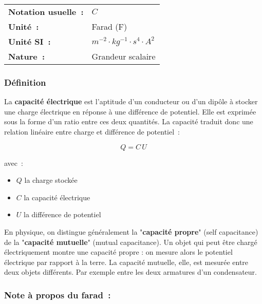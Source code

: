 \vspace{0.5cm}
\begin{tabular}{ll}
\textbf{Notation usuelle~:} & $C$ \\
\textbf{Unité~:} & Farad (F) \\
	\textbf{Unité SI~:} & $m^{-2} \cdot kg^{-1} \cdot {s}^{4} \cdot A^{2}$ \\
\textbf{Nature~:} & Grandeur scalaire \\
\end{tabular} 

\subsubsection*{Définition}

La \textbf{capacité électrique} est l'aptitude d'un conducteur ou d'un dipôle à stocker une charge électrique en réponse à une différence de potentiel. Elle est exprimée sous la forme d'un ratio entre ces deux quantités. La capacité traduit donc une relation linéaire entre charge et différence de potentiel~:

\begin{equation}
	Q = C\,U
\end{equation}

avec~:\\
\begin{itemize}
	\item $Q$ la charge stockée
	\item $C$ la capacité électrique
	\item $U$ la différence de potentiel\\
\end{itemize}

En physique, on distingue généralement la "\textbf{capacité propre}" (self capacitance) de la "\textbf{capacité mutuelle}" (mutual capacitance). Un objet qui peut être chargé électriquement montre une capacité propre : on mesure alors le potentiel électrique par rapport à la terre. La capacité mutuelle, elle, est mesurée entre deux objets différents. Par exemple entre les deux armatures d'un condensateur. 

\subsubsection{Note à propos du farad~: }

